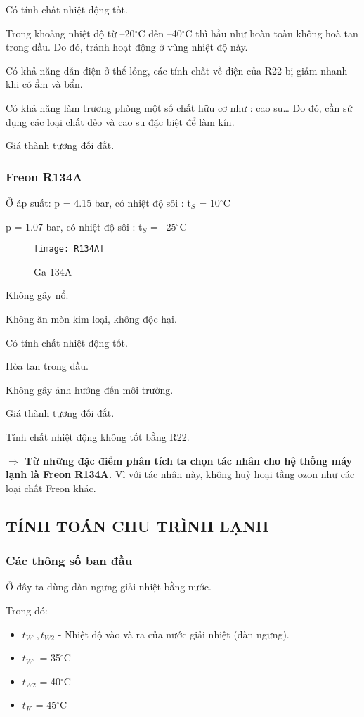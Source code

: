 Có tính chất nhiệt động tốt.

Trong khoảng nhiệt độ từ –20$^{\circ}$C đến –40$^{\circ}$C thì hầu như hoàn toàn không hoà tan trong dầu. Do đó, tránh hoạt động ở vùng nhiệt độ này.

Có khả năng dẫn điện ở thể lỏng, các tính chất về điện của R22 bị giảm nhanh khi có ẩm và bẩn.

Có khả năng làm trương phòng một số chất hữu cơ như : cao su… Do đó, cần sử dụng các loại chất dẻo và cao su đặc biệt để làm kín.

Giá thành tương đối đắt.

\subsubsection{Freon R134A}
Ở áp suất: 
\hspace{1cm}
p = 4.15 bar, có nhiệt độ sôi : t$_{S}$ = 10$^{\circ}$C

\hspace{2.95cm}
p = 1.07 bar, có nhiệt độ sôi : t$_{S}$ = –25$^{\circ}$C
\begin{figure}[H]
	\centering
	\texttt{[image: R134A]}
	\caption{Ga 134A}
\end{figure}

Không gây nổ.

Không ăn mòn kim loại, không độc hại.

Có tính chất nhiệt động tốt.

Hòa tan trong dầu.

Không gây ảnh hưởng đến môi trường.

Giá thành tương đối đắt.

Tính chất nhiệt động không tốt bằng R22.

\textbf{$\Rightarrow$ Từ những đặc điểm phân tích ta chọn tác nhân cho hệ thống máy lạnh là Freon R134A.} Vì với tác nhân này, không huỷ hoại tầng ozon như các loại chất Freon khác.

\subsection{TÍNH TOÁN CHU TRÌNH LẠNH}
\subsubsection{Các thông số ban đầu}
Ở đây ta dùng dàn ngưng giải nhiệt bằng nước.

Trong đó:
\begin{itemize}
	\item $t_{W1}, t_{W2}$ - Nhiệt độ vào và ra của nước giải nhiệt (dàn ngưng).
	\item $t_{W1}$ = 35$^{\circ}$C
	\item $t_{W2}$ = 40$^{\circ}$C
	\item $t_{K}$ = 45$^{\circ}$C
\end{itemize}

